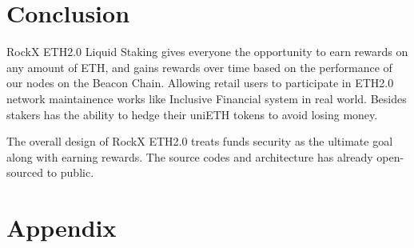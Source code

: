 \documentclass{article}
\begin{document}
\section{Conclusion}
RockX ETH2.0 Liquid Staking gives everyone the opportunity to earn rewards on any amount of ETH,  and gains 
rewards over time based on the performance of our nodes on the Beacon Chain. Allowing retail users to
participate in ETH2.0 network maintainence works like Inclusive Financial system in real world. Besides stakers has 
the ability to hedge their uniETH tokens to avoid losing money.

The overall design of RockX ETH2.0 treats funds security as the ultimate goal along with earning rewards. The source 
codes and architecture has already open-sourced to public.

\newpage
\appendix
\section{Appendix}
\end{document}
